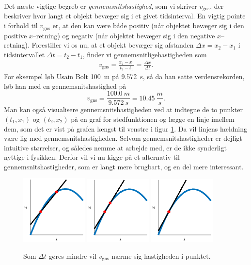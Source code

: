 Det næste vigtige begreb er \emph{gennemsnitshastighed}, som vi skriver $v_\text{gns}$, der beskriver hvor langt et objekt bevæger sig i et givet tidsinterval. En vigtig pointe i forhold til $v_\text{gns}$ er, at den kan være både positiv (når objektet bevæger sig i den positive $x$--retning) og negativ (når objektet bevæger sig i den negative $x$--retning). Forestiller vi os nu, at et objekt bevæger sig afstanden $\Delta x = x_2 - x_1$ i tidsintervallet $\Delta t = t_2-t_1$, finder vi gennemsnitligehastigheden som 
\begin{align}
    v_\text{gns}=\frac{x_2-x_1}{t_2-t_1}=\frac{\Delta x}{\Delta t}.
    \label{mat:eq:gnshast}
\end{align}
For eksempel løb Usain Bolt \SI{100}{m} på \SI{9,572}{s}, så da han satte verdensrekorden, løb han med en gennemsnitshastighed på
\begin{equation*}
    v_\text{gns}=\frac{\SI{100.0}{m}}{\SI{9.572}{s}}=\SI{10.45}{\frac{m}{s}}  .
\end{equation*}
Man kan også visualisere gennemsnitshastigheden ved at indtegne de to punkter $(t_1,x_1)$ og $(t_2,x_2)$ på en graf for stedfunktionen og lægge en linje imellem dem, som det er vist på grafen længst til venstre i figur \ref{mat:fig:diff1}. Da vil linjens hældning være lig med gennemsnitshastigheden. Selvom gennemsnitshastigheder er dejligt intuitive størrelser, og således nemme at arbejde med, er de ikke synderligt nyttige i fysikken. Derfor vil vi nu kigge på et alternativ til gennemsnitshastigheder, som er langt mere brugbart, og en del mere interessant.   
\begin{figure}[h!]
    \centering
    \includegraphics[width=0.3\textwidth]{Mat/matfig/gnshast.eps}
    \includegraphics[width=0.3\textwidth]{Mat/matfig/gnshast2.eps}
    \includegraphics[width=0.3\textwidth]{Mat/matfig/hast.eps}
    \caption{Som $\Delta t$ gøres mindre vil $v_\text{gns}$ nærme sig hastigheden i punktet.}
    \label{mat:fig:diff1}
\end{figure}

